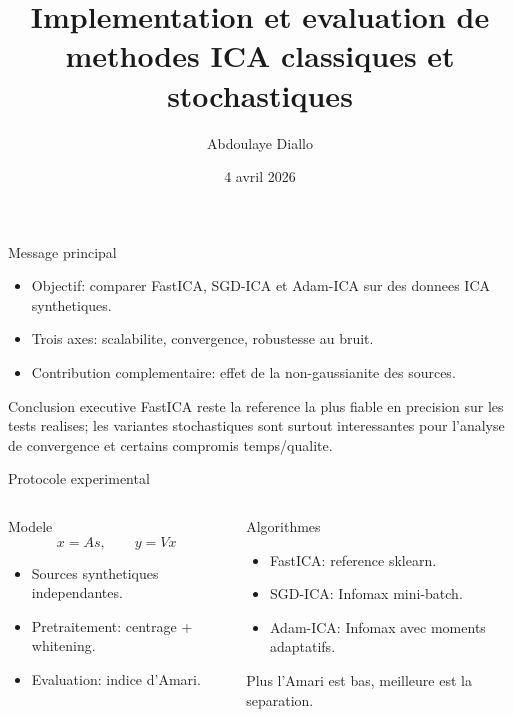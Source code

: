 \documentclass[aspectratio=169,11pt]{beamer}
\title[ICA stochastique]{Implementation et evaluation de methodes ICA classiques et stochastiques}
\author{Abdoulaye Diallo}
\date{4 avril 2026}
\begin{document}
\begin{frame}
  \titlepage
\end{frame}

\begin{frame}{Message principal}
  \begin{itemize}
    \item Objectif: comparer FastICA, SGD-ICA et Adam-ICA sur des donnees ICA synthetiques.
    \item Trois axes: scalabilite, convergence, robustesse au bruit.
    \item Contribution complementaire: effet de la non-gaussianite des sources.
  \end{itemize}

  \vspace{0.5em}
  \begin{block}{Conclusion executive}
    FastICA reste la reference la plus fiable en precision sur les tests realises; les variantes stochastiques sont surtout interessantes pour l'analyse de convergence et certains compromis temps/qualite.
  \end{block}
\end{frame}

\begin{frame}{Protocole experimental}
  \begin{columns}[T,onlytextwidth]
    \begin{block}{Modele}
      \[
      x = As, \qquad y = Vx
      \]
      \begin{itemize}
        \item Sources synthetiques independantes.
        \item Pretraitement: centrage + whitening.
        \item Evaluation: indice d'Amari.
      \end{itemize}
    \end{block}

    \begin{block}{Algorithmes}
      \begin{itemize}
        \item FastICA: reference sklearn.
        \item SGD-ICA: Infomax mini-batch.
        \item Adam-ICA: Infomax avec moments adaptatifs.
      \end{itemize}
      \vspace{0.3em}
      \small
      Plus l'Amari est bas, meilleure est la separation.
    \end{block}
  \end{columns}
\end{frame}
\end{document}
